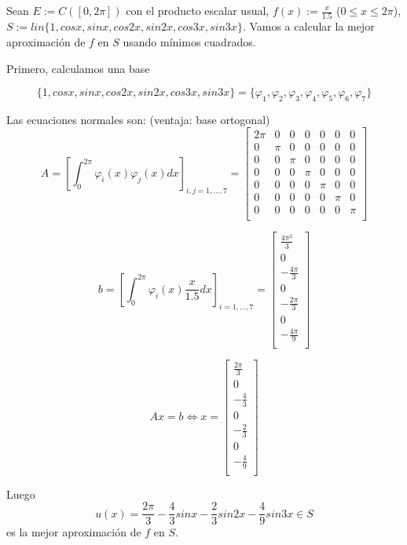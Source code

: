\begin{ejemplo}
Sean $E := C([0,2\pi])$ con el producto escalar usual, $f(x) := \frac{x}{1.5}$ ($0\leq x \leq 2\pi$), $S := lin \lbrace 1, cosx, sinx, cos2x, sin2x, cos3x, sin3x \rbrace$. Vamos a calcular la mejor aproximación de $f$ en $S$ usando mínimos cuadrados.

Primero, calculamos una base

\[ \lbrace 1, cosx, sinx, cos2x, sin2x, cos3x, sin3x \rbrace = \lbrace \varphi _1, \varphi _2, \varphi _3, \varphi _4, \varphi _5, \varphi _6, \varphi _7 \rbrace \]

Las ecuaciones normales son: (ventaja: base ortogonal)
\[ A = \left[ \int_0^{2\pi} \varphi _i (x) \varphi _j (x) dx \right] _{i,j=1,...,7} = 
\begin{bmatrix}
2\pi & 0 & 0 & 0 & 0 & 0 & 0 \\
0 & \pi & 0 & 0 & 0 & 0 & 0 \\
0 & 0 & \pi & 0 & 0 & 0 & 0 \\
0 & 0 & 0 & \pi & 0 & 0 & 0 \\
0 & 0 & 0 & 0 & \pi & 0 & 0 \\
0 & 0 & 0 & 0 & 0 & \pi & 0 \\
0 & 0 & 0 & 0 & 0 & 0 & \pi \\
\end{bmatrix} \]

\[ b = \left[ \int_0^{2\pi} \varphi _i(x) \frac{x}{1.5} dx \right] _{i=1,...,7} = 
\begin{bmatrix}
\frac{4\pi ^2}{3} \\
0 \\
-\frac{4\pi}{3} \\
0 \\
-\frac{2\pi}{3} \\
0 \\
-\frac{4\pi}{9} \\
\end{bmatrix} \]

\[ Ax = b \Leftrightarrow x = \begin{bmatrix}
\frac{2\pi}{3} \\
0 \\
-\frac{4}{3} \\
0 \\
-\frac{2}{3} \\
0 \\
-\frac{4}{9} \\
\end{bmatrix} \]

Luego
\[ u(x) = \frac{2\pi}{3} - \frac{4}{3}sinx - \frac{2}{3}sin2x - \frac{4}{9}sin3x \in S \]
es la mejor aproximación de $f$ en $S$.
\end{ejemplo}

